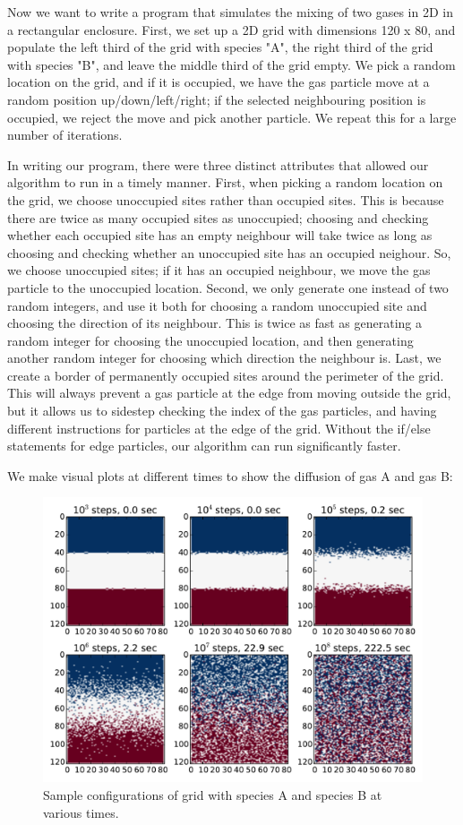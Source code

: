 \documentclass{article}
\begin{document}
\smallskip
Now we want to write a program that simulates the mixing of two gases in 2D in a rectangular enclosure. First, we set up a 2D grid with dimensions 120 x 80, and populate the left third of the grid with species "A", the right third of the grid with species "B", and leave the middle third of the grid empty. We pick a random location on the grid, and if it is occupied, we have the gas particle move at a random position up/down/left/right; if the selected neighbouring position is occupied, we reject the move and pick another particle. We repeat this for a large number of iterations. \par
In writing our program, there were three distinct attributes that allowed our algorithm to run in a timely manner. First, when picking a random location on the grid, we choose unoccupied sites rather than occupied sites. This is because there are twice as many occupied sites as unoccupied; choosing and checking whether each occupied site has an empty neighbour will take twice as long as choosing and checking whether an unoccupied site has an occupied neighour. So, we choose unoccupied sites; if it has an occupied neighbour, we move the gas particle to the unoccupied location. Second, we only generate one instead of two random integers, and use it both for choosing a random unoccupied site and choosing the direction of its neighbour. This is twice as fast as generating a random integer for choosing the unoccupied location, and then generating another random integer for choosing which direction the neighbour is. Last, we create a border of permanently occupied sites around the perimeter of the grid. This will always prevent a gas particle at the edge from moving outside the grid, but it allows us to sidestep checking the index of the gas particles, and having different instructions for particles at the edge of the grid. Without the if/else statements for edge particles, our algorithm can run significantly faster.\par
We make visual plots at different times to show the diffusion of gas A and gas B:\par
\begin{figure}[H]
\centering
\includegraphics[width=12cm]{figures/GP1_3b_1.pdf}
\caption{Sample configurations of grid with species A and species B at various times.}
\label{fig:grid}
\end{figure}
\end{document}
